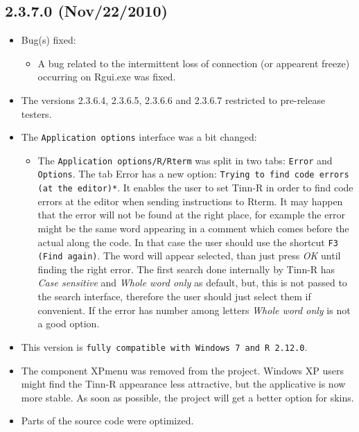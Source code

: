 \subsection*{2.3.7.0 (Nov/22/2010)}
\begin{itemize}
  \item Bug(s) fixed:
    \begin{itemize}
      \item A bug related to the intermittent loss of connection (or appearent freeze) occurring on Rgui.exe was fixed.
    \end{itemize}
  \item The versions 2.3.6.4, 2.3.6.5, 2.3.6.6 and 2.3.6.7 restricted to pre-release testers.
  \item The \texttt{Application options} interface was a bit changed:
    \begin{itemize}
      \item The \texttt{Application options/R/Rterm} was split in two tabs: \texttt{Error} and \texttt{Options}.
        The tab Error has a new option: \texttt{Trying to find code errors (at the editor)*}.
        It enables the user to set Tinn-R in order to find code errors at the editor when sending instructions to Rterm.
        It may happen that the error will not be found at the right place, for example the error might be the same word appearing
        in a comment which comes before the actual along the code. In that case the user should use the shortcut \texttt{F3 (Find again)}.
        The word will appear selected, than just press \textit{OK} until finding the right error.
        The first search done internally by Tinn-R has \textit{Case sensitive} and \textit{Whole word only} as default, but,
        this is not passed to the search interface, therefore the user should just select them if convenient.
        If the error has number among letters \textit{Whole word only} is not a good option.
    \end{itemize}
  \item This version is \texttt{fully compatible with Windows 7 and R 2.12.0}.
  \item The component XPmenu was removed from the project. Windows XP users might find the Tinn-R appearance less attractive,
    but the applicative is now more stable. As soon as possible, the project will get a better option for skins.
  \item Parts of the source code were optimized.
\end{itemize}


